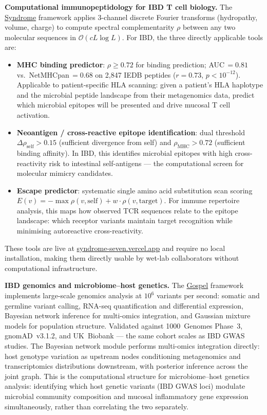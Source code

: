 \documentclass[12pt,a4paper]{article}
\begin{document}
\textbf{Computational immunopeptidology for IBD T cell biology.}
The \href{https://syndrome-seven.vercel.app/tools}{Syndrome} framework applies
3-channel discrete Fourier transforms (hydropathy, volume, charge) to compute
spectral complementarity $\rho$ between any two molecular sequences in
$\mathcal{O}(cL\log L)$.
For IBD, the three directly applicable tools are:
\begin{itemize}
  \item \textbf{MHC binding predictor}: $\rho \geq 0.72$ for binding prediction;
    AUC\,$=0.81$ vs.\ NetMHCpan\,$=0.68$ on 2,847 IEDB peptides
    ($r=0.73$, $p<10^{-12}$).
    Applicable to patient-specific HLA scanning: given a patient's HLA haplotype
    and the microbial peptide landscape from their metagenomics data, predict
    which microbial epitopes will be presented and drive mucosal T cell activation.
  \item \textbf{Neoantigen / cross-reactive epitope identification}: dual threshold
    $\Delta\rho_\mathrm{self} > 0.15$ (sufficient divergence from self) and
    $\rho_\mathrm{MHC} > 0.72$ (sufficient binding affinity).
    In IBD, this identifies microbial epitopes with high cross-reactivity risk
    to intestinal self-antigens --- the computational screen for molecular
    mimicry candidates.
  \item \textbf{Escape predictor}: systematic single amino acid substitution scan
    scoring $E(v) = -\max\rho(v, \mathrm{self}) + w \cdot \rho(v, \mathrm{target})$.
    For immune repertoire analysis, this maps how observed TCR sequences relate to
    the epitope landscape: which receptor variants maintain target recognition
    while minimising autoreactive cross-reactivity.
\end{itemize}
These tools are live at \href{https://syndrome-seven.vercel.app/tools}{syndrome-seven.vercel.app}
and require no local installation, making them directly usable by wet-lab
collaborators without computational infrastructure.

\textbf{IBD genomics and microbiome--host genetics.}
The \href{https://github.com/fullscreen-triangle/gospel}{Gospel} framework
implements large-scale genomics analysis at $10^6$ variants per second:
somatic and germline variant calling, RNA-seq quantification and differential
expression, Bayesian network inference for multi-omics integration, and
Gaussian mixture models for population structure.
Validated against 1000~Genomes Phase~3, gnomAD~v3.1.2, and UK~Biobank ---
the same cohort scales as IBD GWAS studies.
The Bayesian network module performs multi-omics integration directly:
host genotype variation as upstream nodes conditioning metagenomics and
transcriptomics distributions downstream, with posterior inference across
the joint graph.
This is the computational structure for microbiome--host genetics analysis:
identifying which host genetic variants (IBD GWAS loci) modulate microbial
community composition and mucosal inflammatory gene expression simultaneously,
rather than correlating the two separately.
\end{document}
